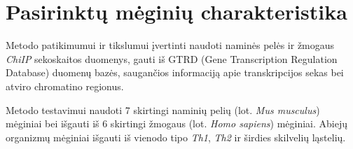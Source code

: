 \documentclass[12pt]{article}
\begin{document}


\newpage


\section{Pasirinktų mėginių charakteristika}
Metodo patikimumui ir tikslumui įvertinti naudoti naminės pelės ir žmogaus
\emph{ChiIP} sekoskaitos duomenys, gauti iš GTRD (Gene Transcription Regulation
Database)\cite{GTRD} duomenų bazės, saugančios informaciją apie transkripcijos
sekas bei atviro chromatino regionus.

Metodo testavimui naudoti 7 skirtingi naminių pelių (lot. \emph{Mus musculus})
mėginiai bei išgauti iš 6 skirtingi žmogaus (lot. \emph{Homo sapiens}) mėginiai.
Abiejų organizmų mėginiai išgauti iš vienodo tipo \emph{Th1}, \emph{Th2} ir
širdies skilvelių ląstelių. 
\end{document}
